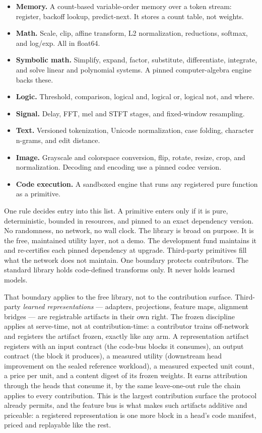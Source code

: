 \documentclass[11pt]{article}
\begin{document}
\begin{itemize}
\item \textbf{Memory.} A count-based variable-order memory over a
token stream: register, backoff lookup, predict-next. It stores a
count table, not weights.
\item \textbf{Math.} Scale, clip, affine transform, L2
normalization, reductions, softmax, and log/exp. All in float64.
\item \textbf{Symbolic math.} Simplify, expand, factor,
substitute, differentiate, integrate, and solve linear and
polynomial systems. A pinned computer-algebra engine backs these.
\item \textbf{Logic.} Threshold, comparison, logical and, logical
or, logical not, and where.
\item \textbf{Signal.} Delay, FFT, mel and STFT stages, and
fixed-window resampling.
\item \textbf{Text.} Versioned tokenization, Unicode
normalization, case folding, character n-grams, and edit
distance.
\item \textbf{Image.} Grayscale and colorspace conversion, flip,
rotate, resize, crop, and normalization. Decoding and encoding
use a pinned codec version.
\item \textbf{Code execution.} A sandboxed engine that runs any
registered pure function as a primitive.
\end{itemize}

One rule decides entry into this list. A primitive enters only if
it is pure, deterministic, bounded in resources, and pinned to an
exact dependency version. No randomness, no network, no wall
clock. The library is broad on purpose. It is the free,
maintained utility layer, not a demo. The development fund
maintains it and re-certifies each pinned dependency at upgrade.
Third-party primitives fill what the network does not maintain.
One boundary protects contributors. The standard library holds
code-defined transforms only. It never holds learned models.

That boundary applies to the free library, not to the
contribution surface. Third-party \emph{learned representations}
--- adapters, projections, feature maps, alignment bridges --- are
registrable artifacts in their own right. The frozen discipline
applies at serve-time, not at contribution-time: a contributor
trains off-network and registers the artifact frozen, exactly like
any arm. A representation artifact registers with an input
contract (the code-bus blocks it consumes), an output contract
(the block it produces), a measured utility (downstream head
improvement on the sealed reference workload), a measured expected
unit count, a price per unit, and a content digest of its frozen
weights. It earns attribution through the heads that consume it,
by the same leave-one-out rule the chain applies to every
contribution. This is the largest contribution surface the
protocol already permits, and the feature bus is what makes such
artifacts additive and priceable: a registered representation is
one more block in a head's code manifest, priced and replayable
like the rest.
\end{document}
